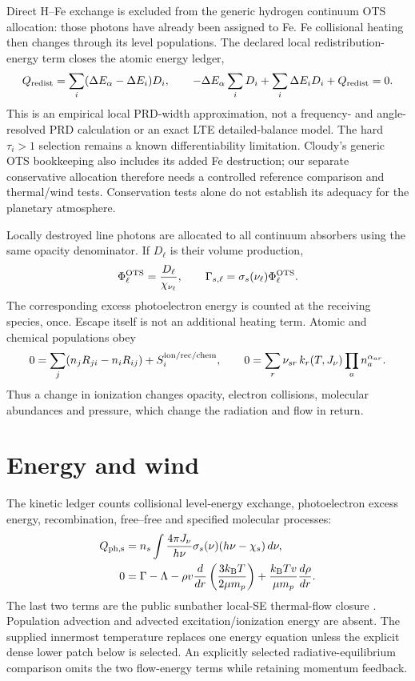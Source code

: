 \documentclass[10pt,a4paper]{article}
\newcommand{\kb}{k_{\mathrm B}}
\begin{document}
Direct H--Fe exchange is excluded from the generic hydrogen continuum OTS
allocation: those photons have already been assigned to Fe. Fe collisional
heating then changes through its level populations. The declared local
redistribution-energy term closes the atomic energy ledger,
\begin{equation}
 Q_{\rm redist}=\sum_i(\Delta E_\alpha-\Delta E_i)D_i,
 \qquad
 -\Delta E_\alpha\sum_iD_i+\sum_i\Delta E_iD_i+Q_{\rm redist}=0.
 \label{eq:iron_energy}
\end{equation}
This is an empirical local PRD-width approximation, not a frequency- and
angle-resolved PRD calculation or an exact LTE detailed-balance model. The
hard $\tau_i>1$ selection remains a known differentiability limitation.
Cloudy's generic OTS bookkeeping also includes its added Fe destruction;
our separate conservative allocation therefore needs a controlled reference
comparison and thermal/wind tests. Conservation tests alone do not establish
its adequacy for the planetary atmosphere.

Locally destroyed line photons are allocated to all continuum absorbers
using the same opacity denominator. If $D_\ell$ is their volume production,
\begin{equation}
 \Phi^{\rm OTS}_\ell=\frac{D_\ell}{\chi_{\nu_\ell}},\qquad
 \Gamma_{s,\ell}=\sigma_s(\nu_\ell)\Phi^{\rm OTS}_\ell.
 \label{eq:ots}
\end{equation}
The corresponding excess photoelectron energy is counted at the receiving
species, once. Escape itself is not an additional heating term.
Atomic and chemical populations obey
\begin{equation}
 0=\sum_j(n_jR_{ji}-n_iR_{ij})+S_i^{\rm ion/rec/chem},\qquad
 0=\sum_r\nu_{sr}\,k_r(T,J_\nu)\prod_a n_a^{\alpha_{ar}}.
 \label{eq:rates}
\end{equation}
Thus a change in ionization changes opacity, electron collisions, molecular
abundances and pressure, which change the radiation and flow in return.

\section{Energy and wind}
The kinetic ledger counts collisional level-energy exchange, photoelectron
excess energy, recombination, free--free and specified molecular processes:
\begin{align}
 Q_{\rm ph,s}&=n_s\int \frac{4\pi J_\nu}{h\nu}\sigma_s(\nu)
                    (h\nu-\chi_s)\,d\nu,\label{eq:photoheat}\\
 0&=\Gamma-\Lambda-\rho v\frac{d}{dr}
       \left(\frac{3\kb T}{2\mu m_p}\right)
       +\frac{\kb T v}{\mu m_p}\frac{d\rho}{dr}.\label{eq:energy}
\end{align}
The last two terms are the public sunbather local-SE thermal-flow closure
\cite{sunbather}. Population advection and advected excitation/ionization
energy are absent. The supplied innermost temperature replaces one energy
equation unless the explicit dense lower patch below is selected.
An explicitly selected radiative-equilibrium comparison omits the
two flow-energy terms while retaining momentum feedback.
\end{document}
